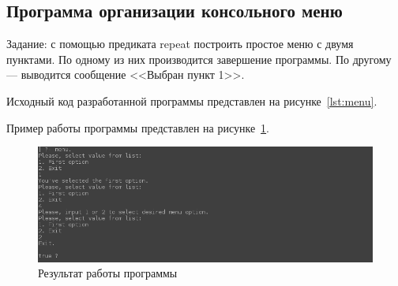 \subsection{Программа организации консольного меню}

Задание: с помощью предиката repeat построить простое меню с
двумя пунктами. По одному из них производится завершение программы. 
По другому --- выводится сообщение <<Выбран пункт 1>>.

Исходный код разработанной программы представлен на
рисунке~\ref{lst:menu}.

Пример работы программы представлен на рисунке~\ref{fig:menu}.

\begin{figure}[h!]
  \centering
  \includegraphics[width=150mm]{img/menu}
  \caption{Результат работы программы}
  \label{fig:menu}
\end{figure}

\pagebreak


